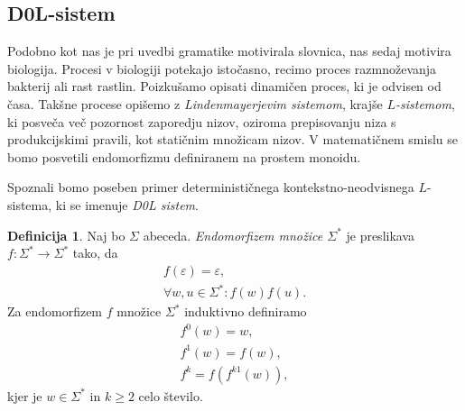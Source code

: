 \documentclass{amsart}
\theoremstyle{definition}
\newtheorem{definicija}{Definicija}[section]
\newtheorem{primer}[definicija]{Primer}
\theoremstyle{plain} %
\begin{document}

    

\subsection*{D0L-sistem}

Podobno kot nas je pri uvedbi gramatike motivirala slovnica, nas sedaj motivira biologija. Procesi v biologiji
potekajo istočasno, recimo proces razmnoževanja bakterij ali rast rastlin. Poizkušamo opisati dinamičen proces, ki je odvisen od časa.
Takšne procese opišemo z \textit{Lindenmayerjevim sistemom}, krajše \textit{$ L $-sistemom}, ki posveča več pozornost zaporedju nizov,
oziroma prepisovanju niza s produkcijskimi pravili, kot statičnim množicam nizov. V matematičnem smislu se bomo posvetili endomorfizmu
definiranem na prostem monoidu.

Spoznali bomo poseben primer determinističnega kontekstno-neodvisnega $ L $-sistema, ki se imenuje \textit{D0L sistem}.

\begin{definicija}
    
    Naj bo $ \Sigma $ abeceda. \textit{Endomorfizem množice $ \Sigma^* $} je preslikava $ f \colon \Sigma^* \rightarrow \Sigma^* $
    tako, da 
    \begin{gather*}
        f(\varepsilon) = \varepsilon, \\
        \forall w,u \in \Sigma^* \colon f(w)f(u).
    \end{gather*}
    Za endomorfizem $ f $ množice $ \Sigma^* $ induktivno definiramo
    \begin{gather*}
        f^0(w) = w, \\
        f^1(w) = f(w), \\
        f^k = f(f^{k1}(w)),
    \end{gather*}
    kjer je $ w \in \Sigma^* $ in $ k \geq 2 $ celo število.

\end{definicija}
\end{document}
